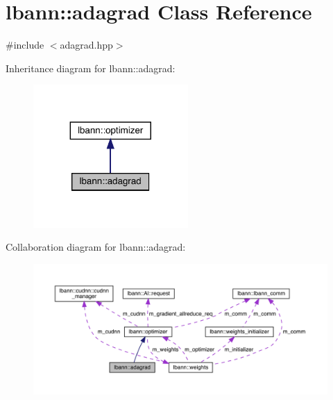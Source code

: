 \hypertarget{classlbann_1_1adagrad}{}\section{lbann\+:\+:adagrad Class Reference}
\label{classlbann_1_1adagrad}


{\ttfamily \#include $<$adagrad.\+hpp$>$}



Inheritance diagram for lbann\+:\+:adagrad\+:\nopagebreak
\begin{figure}[H]
\begin{center}
\leavevmode
\includegraphics[width=167pt]{classlbann_1_1adagrad__inherit__graph}
\end{center}
\end{figure}


Collaboration diagram for lbann\+:\+:adagrad\+:\nopagebreak
\begin{figure}[H]
\begin{center}
\leavevmode
\includegraphics[width=350pt]{classlbann_1_1adagrad__coll__graph}
\end{center}
\end{figure}
